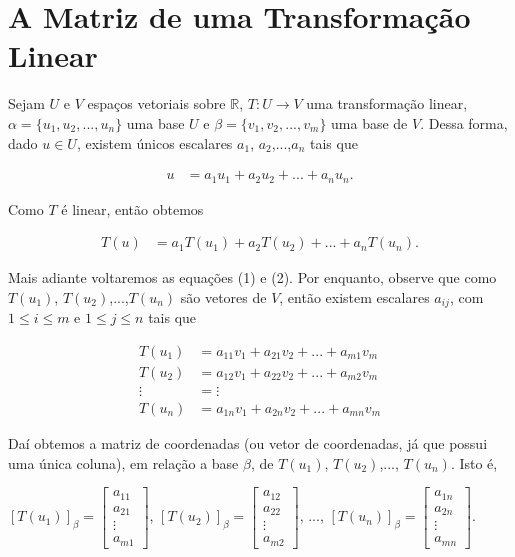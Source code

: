 \section{A Matriz de uma Transformação Linear}


Sejam $U$ e $V$ espaços vetoriais sobre $\mathbb{R}$,  $T: U \rightarrow V$ uma transformação linear, $\alpha=\{ u_1, u_2, ...,u_n\}$ uma base $U$ e $\beta=\{v_1, v_2, ...,v_m\}$ uma base de $V$.  Dessa forma, dado $u\in U$, existem  únicos escalares $a_1$, $a_2$,...,$a_n$ tais que

\begin{align}
u&=a_1u_1+ a_2u_2+ ...+a_nu_n .
\end{align}

Como $T$ é linear, então obtemos

\begin{align}
T(u)&=a_1T(u_1)+ a_2T(u_2)+ ...+a_nT(u_n).
\end{align}

%

Mais adiante voltaremos as equações (1) e (2). Por enquanto, observe que como $T(u_1)$,  $T(u_2)$,...,$T(u_n)$ são vetores de $V$,  então existem escalares $a_{ij}$, com $1\leq i \leq m$  e $1\leq j \leq n$ tais que

\begin{align}
T(u_1)&=a_{11}v_1+ a_{21}v_2+ ...+a_{m1}v_m \nonumber \\
T(u_2)&=a_{12}v_1+ a_{22}v_2+ ...+a_{m2}v_m \nonumber \\
      \vdots&= \vdots \\
T(u_n)&=a_{1n}v_1+ a_{2n}v_2+ ...+a_{mn}v_m \nonumber
\end{align}

Daí obtemos a matriz de coordenadas (ou vetor de coordenadas, já que possui uma única coluna), em relação a base $\beta$, de $T(u_1)$, $T(u_2)$,..., $T(u_n)$. Isto é,

$[T(u_1)]_{\beta}=\left[ \begin{array}{c}a_{11} \\ a_{21} \\ \vdots \\ a_{m1}\end{array} \right]$, $[T(u_2)]_{\beta}=\left[ \begin{array}{c}a_{12} \\ a_{22} \\ \vdots \\ a_{m2}\end{array} \right]$, ..., $[T(u_n)]_{\beta}=\left[ \begin{array}{c}a_{1n} \\ a_{2n} \\ \vdots \\ a_{mn}\end{array} \right]$.



